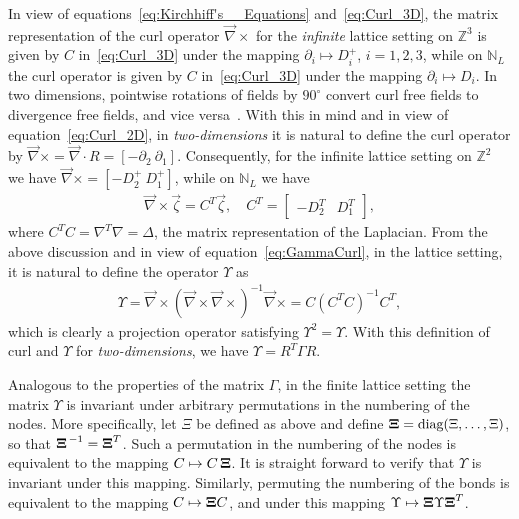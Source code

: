 \documentclass{cmslatex}
\newcommand\bXi{\mbox{\boldmath${\Xi}$}}
\begin{document}
In view of equations~\eqref{eq:Kirchhiff's__Equations}
and~\eqref{eq:Curl_3D}, the matrix representation of the curl operator 
$\vec{\nabla}\times$ for the \emph{infinite} lattice setting on $\mathbb{Z}^3$
is given by $C$ in~\eqref{eq:Curl_3D} under the mapping $\partial_i\mapsto D^+_i$,
$i=1,2,3$, while on $\mathbb{N}_L$ the curl operator is given by
$C$ in~\eqref{eq:Curl_3D} under the mapping $\partial_i\mapsto D_i$. In two
dimensions, pointwise rotations of fields by $90^\circ$ convert curl free
fields to divergence free fields, and vice
versa~\cite{MILTON:2002:TC}. With this in mind and in view of
equation~\eqref{eq:Curl_2D}, in \emph{two-dimensions} it is natural to
define the curl operator by $\vec{\nabla}\times=\vec{\nabla}\cdot R=[ - \partial_2 \
\partial_1]$. Consequently, for the infinite lattice setting on
$\mathbb{Z}^2$ we have $\vec{\nabla}\times=[ - D^+_2 \ D^+_1]$, while on
$\mathbb{N}_L$ we have  
%
\begin{align}
  \vec{\nabla}\times\vec{\zeta}=C^T\vec{\zeta}, \quad
  C^T=
  \left[
    \begin{array}{ccc}
       -D_2^T  &   D_1^T
    \end{array}
  \right],
\end{align}
%
where $C^TC=\nabla^T\nabla=\Delta$, the matrix representation of the Laplacian. From
the above discussion and in view of equation~\eqref{eq:GammaCurl}, in
the lattice setting, it is natural to define the operator $\Upsilon$ as
%
\begin{align}\label{eq:GammaCurl_NL}
  \Upsilon=\vec{\nabla}\times(\vec{\nabla}\times\vec{\nabla}\times)^{-1}\vec{\nabla}\times
   =C(C^TC)^{-1}C^T,
\end{align}
%
which is clearly a projection operator satisfying $\Upsilon^2=\Upsilon$. With this
definition of curl and $\Upsilon$ for \emph{two-dimensions}, we have $\Upsilon=R^T\Gamma R$. 




Analogous
to the properties of the matrix $\Gamma$, in the finite lattice setting the 
matrix $\Upsilon$ is invariant under arbitrary permutations in the numbering
of the nodes. More specifically, let $\Xi$ be defined as above and
define $\bXi=\text{diag}(\Xi,\ldots,\Xi)$, so that $\bXi^{\,-1}=\bXi^T$. Such a
permutation in the 
numbering of the nodes is equivalent to the mapping
$C\mapsto C\,\bXi$. It is straight forward to verify that $\Upsilon$ is invariant
under this mapping. Similarly, permuting the numbering of
the bonds is equivalent to the mapping $C\mapsto \bXi C$, and under
this mapping $\Upsilon\mapsto \bXi \Upsilon {\bXi}^T$.  
\end{document}
